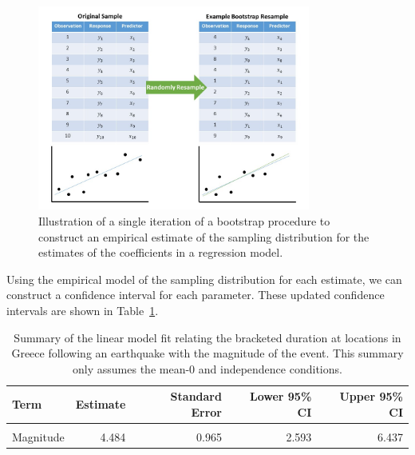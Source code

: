 \documentclass[
  letterpaper,
  DIV=11,
  numbers=noendperiod]{scrreprt}
\theoremstyle{plain}
\theoremstyle{definition}
\theoremstyle{definition}
\theoremstyle{remark}
\begin{document}
\begin{figure}

{\centering \includegraphics[width=0.8\textwidth,height=\textheight]{./images/RegConditions-Bootstrap.jpg}

}

\caption{\label{fig-regconditions-bootstrap}Illustration of a single
iteration of a bootstrap procedure to construct an empirical estimate of
the sampling distribution for the estimates of the coefficients in a
regression model.}

\end{figure}

Using the empirical model of the sampling distribution for each
estimate, we can construct a confidence interval for each parameter.
These updated confidence intervals are shown in
Table~\ref{tbl-regconditions-slr-summary-alt}.

\hypertarget{tbl-regconditions-slr-summary-alt}{}
\begin{table}
\caption{\label{tbl-regconditions-slr-summary-alt}Summary of the linear model fit relating the bracketed duration at
locations in Greece following an earthquake with the magnitude of the
event. This summary only assumes the mean-0 and independence conditions. }\tabularnewline

\centering
\begin{tabular}[t]{lrrrr}
\toprule
Term & Estimate & Standard Error & Lower 95\% CI & Upper 95\% CI\\
\midrule
\cellcolor{gray!6}{(Intercept)} & \cellcolor{gray!6}{-19.194} & \cellcolor{gray!6}{4.960} & \cellcolor{gray!6}{-29.258} & \cellcolor{gray!6}{-9.545}\\
Magnitude & 4.484 & 0.965 & 2.593 & 6.437\\
\bottomrule
\end{tabular}
\end{table}
\end{document}
